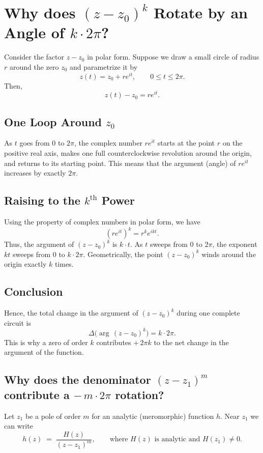 \documentclass[12pt]{article}
\theoremstyle{definition} %
\theoremstyle{plain} %
\begin{document}
\section*{Why does \((z-z_0)^k\) Rotate by an Angle of \(k \cdot 2\pi\)?}

Consider the factor \(z-z_0\) in polar form. Suppose we draw a small circle of radius \(r\) around the zero \(z_0\) and parametrize it by
\[
z(t)=z_0+re^{it},\qquad 0\le t\le 2\pi.
\]
Then,
\[
z(t)-z_0= re^{it}.
\]

\subsection*{One Loop Around \(z_0\)}
As \(t\) goes from \(0\) to \(2\pi\), the complex number \(re^{it}\) starts at the point \(r\) on the positive real axis, makes one full counterclockwise revolution around the origin, and returns to its starting point. This means that the argument (angle) of \(re^{it}\) increases by exactly \(2\pi\).

\subsection*{Raising to the \(k^{\text{th}}\) Power}
Using the property of complex numbers in polar form, we have
\[
(re^{it})^k = r^k e^{ikt}.
\]
Thus, the argument of \((z-z_0)^k\) is \(k \cdot t\). As \(t\) sweeps from \(0\) to \(2\pi\), the exponent \(kt\) sweeps from \(0\) to \(k \cdot 2\pi\). Geometrically, the point \((z-z_0)^k\) winds around the origin exactly \(k\) times.

\subsection*{Conclusion}
Hence, the total change in the argument of \((z-z_0)^k\) during one complete circuit is
\[
\Delta\!\bigl(\arg\,(z-z_0)^k\bigr) = k \cdot 2\pi.
\]
This is why a zero of order \(k\) contributes \(+\,2\pi k\) to the net change in the argument of the function.

\subsection*{Why does the denominator \((z-z_{1})^{m}\) contribute a \(-\,m\cdot2\pi\) rotation?}

Let \(z_{1}\) be a pole of order \(m\) for an analytic (meromorphic) function \(h\).  
Near \(z_{1}\) we can write
\[
   h(z)\;=\;\frac{H(z)}{(z-z_{1})^{m}},
   \qquad\text{where }H(z)\text{ is analytic and }H(z_{1})\neq0.
\]
\end{document}
